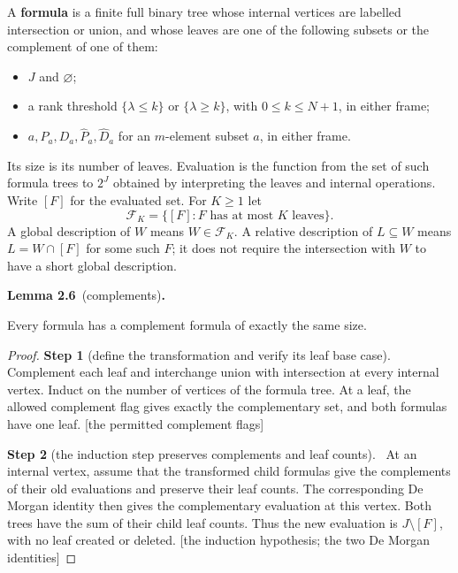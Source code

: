\documentclass[11pt,a4paper]{article}
\providecommand{\tightlist}{\setlength{\itemsep}{0pt}\setlength{\parskip}{0pt}}
\theoremstyle{plain}
\theoremstyle{definition}
\newenvironment{numbered}[3]{\par\addvspace{\medskipamount}\Needspace{3\baselineskip}\noindent
  \textbf{#1 #2}\if\relax\detokenize{#3}\relax\else\ (#3)\fi\textbf{.}\ \itshape\ignorespaces}
  {\par\addvspace{\smallskipamount}}
\newcommand{\uses}[1]{\par\nopagebreak[4]\noindent{\small\textsf{Uses:} #1}\par\smallskip}
\newcommand{\step}[2]{\par\smallskip\noindent\textbf{Step #1} (#2).\ \ignorespaces}
\newcommand{\by}[1]{{\small[#1]}}
\begin{document}
A \textbf{formula} is a finite full binary tree whose internal vertices are labelled intersection or union, and whose leaves are one of the following subsets or the complement of one of them:

\begin{itemize}
\tightlist
\item
  \(J\) and \(\varnothing\);
\item
  a rank threshold \(\{\lambda\leq k\}\) or \(\{\lambda\geq k\}\), with \(0\leq k\leq N+1\), in either frame;
\item
  \(a,P_a,D_a,\widehat P_a,\widehat D_a\) for an \(m\)-element subset \(a\), in either frame.
\end{itemize}

Its size is its number of leaves. Evaluation is the function from the set of such formula trees to \(2^J\) obtained by interpreting the leaves and internal operations. Write \([F]\) for the evaluated set. For \(K\geq1\) let \[
\mathcal F_K=\{[F]:F\text{ has at most }K\text{ leaves}\}.
\] A global description of \(W\) means \(W\in\mathcal F_K\). A relative description of \(L\subseteq W\) means \(L=W\cap[F]\) for some such \(F\); it does not require the intersection with \(W\) to have a short global description.

\begin{numbered}{Lemma}{2.6}{complements}

Every formula has a complement formula of exactly the same size.

\end{numbered}
\uses{definitions only.}

\begin{proof}
\step{1}{define the transformation and verify its leaf base case}
Complement each leaf and interchange union with intersection at every internal vertex. Induct on the number of vertices of the formula tree. At a leaf, the allowed complement flag gives exactly the complementary set, and both formulas have one leaf.
\by{the permitted complement flags}

\step{2}{the induction step preserves complements and leaf counts}
At an internal vertex, assume that the transformed child formulas give the complements of their old evaluations and preserve their leaf counts. The corresponding De Morgan identity then gives the complementary evaluation at this vertex. Both trees have the sum of their child leaf counts. Thus the new evaluation is \(J\setminus[F]\), with no leaf created or deleted.
\by{the induction hypothesis; the two De Morgan identities}
\end{proof}
\end{document}
